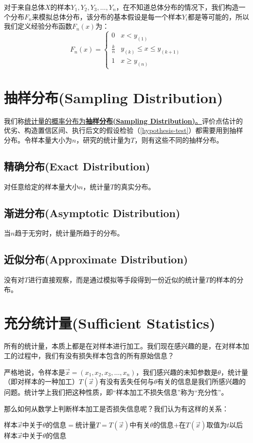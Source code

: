 \documentclass[UTF8]{ctexbook}
\begin{document}
对于来自总体$X$的样本$Y_1, Y_2, Y_3,\dots, Y_n$，在不知道总体分布的情况下，我们构造一个分布$F_n$来模拟总体分布，该分布的基本假设是每一个样本$Y_i$都是等可能的，所以我们定义经验分布函数$F_n(x)$为：
\[
	F_n(x)=\begin{cases}
		0 & x<y_{(1)} \\
		\frac{k}{n} & y_{(k)}\leq x\leq y_{(k+1)} \\
		1 & x\geq y_{(n)}
	\end{cases}
\]
\section{抽样分布(Sampling Distribution)}
我们称\underline{统计量的概率分布为\textbf{抽样分布(Sampling Distribution)}。}评价点估计的优劣、构造置信区间、执行后文的假设检验（\ref{hypothesis-test}）都需要用到抽样分布。令样本量大小为$n$，研究的统计量为$T$，则有这些不同的抽样分布。
\subsection{精确分布(Exact Distribution)}
对任意给定的样本量大小$n$，统计量$T$的真实分布。
\subsection{渐进分布(Asymptotic Distribution)}
当$n$趋于无穷时，统计量所趋于的分布。
\subsection{近似分布(Approximate Distribution)}
没有对$T$进行直接观察，而是通过模拟等手段得到一份近似的统计量$T$的样本的分布。
\section{充分统计量(Sufficient Statistics)}
所有的统计量，本质上都是在对样本进行加工。我们现在感兴趣的是，在对样本加工的过程中，我们有没有损失样本包含的所有原始信息？

严格地说，令样本是$\vec{x}=(x_1,x_2,x_3,\dots,x_n)$，我们感兴趣的未知参数是$\theta$，统计量（即对样本的一种加工）$T(\vec{x})$有没有丢失任何与$\theta$有关的信息是我们所感兴趣的问题。统计学上我们把这种性质，即“样本加工不损失信息”称为“充分性”。

那么如何从数学上判断样本加工是否损失信息呢？我们认为有这样的关系：
\begin{center}
	样本$\vec{x}$中关于$\theta$的信息$=$统计量$T=T(\vec x)$中有关$\theta$的信息$+$在$T(\vec x)$取值为$t$以后样本$\vec x$中关于$\theta$的信息
\end{center}
\end{document}
